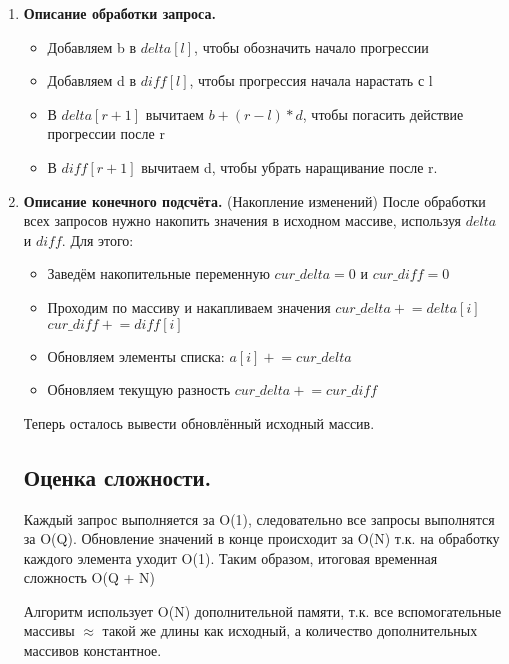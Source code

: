 \documentclass[a4paper,14pt]{article}
\begin{document}
\begin{enumerate}
    \item\textbf{Описание обработки запроса.}

    \begin{itemize}
        \item Добавляем b в $delta[l]$, чтобы обозначить начало прогрессии
        \item Добавляем d в $diff[l]$, чтобы прогрессия начала нарастать с l
        \item В $delta[r + 1]$ вычитаем  $b + (r - l) * d$, чтобы погасить действие прогрессии после r
        \item В $diff[r + 1]$ вычитаем d, чтобы убрать наращивание после r.
    \end{itemize}

    \item\textbf{Описание конечного подсчёта.}
    (Накопление изменений) После обработки всех запросов нужно накопить значения в исходном массиве, используя $delta$ и $diff$. Для этого:

    \begin{itemize}
        \item Заведём накопительные переменную $cur\_delta = 0$ и $cur\_diff = 0$
        \item Проходим по массиву и накапливаем значения $cur\_delta \mathrel{+}= delta[i]$ $cur\_diff \mathrel{+}= diff[i]$
        \item Обновляем элементы списка: $a[i] \mathrel{+}= cur\_delta$
        \item Обновляем текущую разность $cur\_delta \mathrel{+}= cur\_diff$
    \end{itemize}

    Теперь осталось вывести обновлённый исходный массив.

    \subsection{Оценка сложности.}
    Каждый запрос выполняется за O(1), следовательно все запросы выполнятся за O(Q). Обновление значений в конце происходит за O(N) т.к. на обработку каждого элемента уходит O(1). Таким образом, итоговая временная сложность O(Q + N)

    Алгоритм использует O(N) дополнительной памяти, т.к. все вспомогательные массивы $\approx$ такой же длины как исходный, а количество дополнительных массивов константное.

\end{enumerate}
\end{document}
